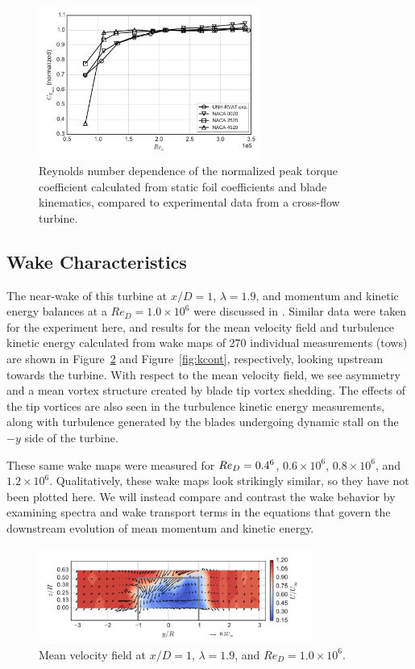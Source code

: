\documentclass[energies,article,accept,moreauthors,pdftex,12pt,a4paper]{mdpi}
\begin{document}
\begin{figure}[ht!]
\centering
\includegraphics[width=0.65\textwidth]{figures/cft_re_dep_foils}
\caption{Reynolds number dependence of the normalized peak torque coefficient 
calculated from static foil coefficients and blade kinematics, compared to 
experimental data from a cross-flow turbine.}
\label{fig:foils-C_T-Re-dep}
\end{figure}


\subsection{Wake Characteristics}

The near-wake of this turbine at $x/D=1$, $\lambda=1.9$, and momentum and 
kinetic energy balances at a $Re_D = 1.0 \times 
10^6$ were discussed in \cite{Bachant2015-JoT}. Similar data were taken for the
experiment here, and results for the mean velocity field and turbulence kinetic
energy calculated from wake maps of 270 individual measurements (tows) are 
shown in Figure~\ref{fig:meancontquiv} and Figure~\ref{fig:kcont},
respectively, looking upstream towards the turbine. With respect to the mean 
velocity field, we see asymmetry and a
mean vortex structure created by blade tip vortex shedding. The effects of
the tip vortices are also seen in the turbulence kinetic energy measurements,
along with turbulence generated by the blades undergoing dynamic stall on the
$-y$ side of the turbine.

These same wake maps were measured for $Re_D = 0.4 \time 10^6$, $0.6 \times 
10^6$,
$0.8 \times 10^6$, and $1.2 \times 10^6$. Qualitatively, these wake maps look 
strikingly
similar, so they have not been plotted here. We will instead compare and
contrast the wake behavior by examining spectra and wake transport terms in the
equations that govern the downstream evolution of mean momentum and kinetic 
energy.

\begin{figure}[ht!]
\centering
\includegraphics[width=0.8\textwidth]{figures/meancontquiv_10}
\caption{Mean velocity field at $x/D=1$, $\lambda=1.9$, and $Re_D=1.0 \times 10^6$.}
\label{fig:meancontquiv}
\end{figure}
\end{document}
